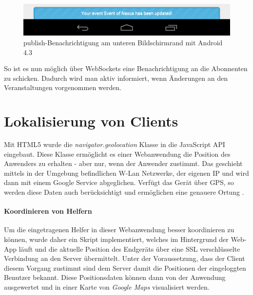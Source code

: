 \begin{figure}[!ht]
	\centering
	\includegraphics[width=15cm]{fig/noty_android}
	\caption{publish-Benachrichtigung am unteren Bildschirmrand mit Android 4.3}
\end{figure}

So ist es nun möglich über WebSockets eine Benachrichtigung an die Abonnenten zu schicken. Dadurch wird man aktiv informiert, wenn Änderungen an den Veranstaltungen vorgenommen werden. 


\section{Lokalisierung von Clients}
Mit HTML5 wurde die \emph{navigator.geolocation} Klasse in die JavaScript API eingebaut. Diese Klasse ermöglicht es einer Webanwendung die Position des Anwenders zu erhalten - aber nur, wenn der Anwender zustimmt. Das geschieht mittels in der Umgebung befindlichen W-Lan Netzwerke, der eigenen IP und wird dann mit einem Google Service abgeglichen. Verfügt das Gerät über GPS, so werden diese Daten auch berücksichtigt und ermöglichen eine genauere Ortung \cite[1. Absatz]{html5:geolocations}.

\paragraph{Koordinieren von Helfern}
Um die eingetragenen Helfer in dieser Webanwendung besser koordinieren zu können, wurde daher ein Skript implementiert, welches im Hintergrund der Web-App läuft und die aktuelle Position des Endgeräts über eine SSL verschlüsselte Verbindung an den Server übermittelt. Unter der Voraussetzung, dass der Client diesem Vorgang zustimmt sind dem Server damit die Positionen der eingeloggten Benutzer bekannt. Diese Positionsdaten können dann von der Anwendung ausgewertet und in einer Karte von \emph{Google Maps} \cite{google:maps} visualisiert werden.

